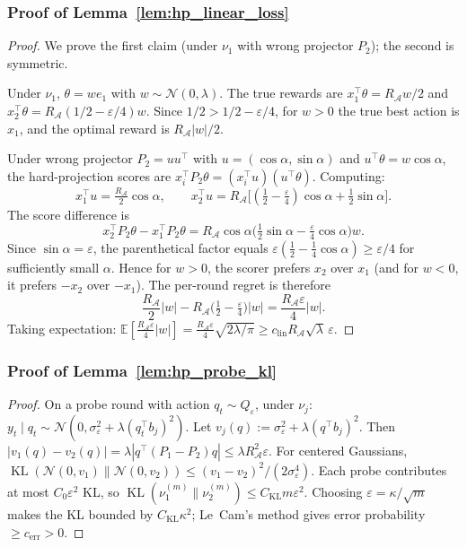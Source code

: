 \documentclass{article}
\newcommand{\E}{\mathbb{E}}
\newcommand{\cA}{\mathcal{A}}
\DeclareMathOperator{\KL}{KL}
\begin{document}
\subsubsection{Proof of Lemma~\ref{lem:hp_linear_loss}}
\label{proof:hp_linear_loss}

\begin{proof}
We prove the first claim (under $\nu_1$ with wrong projector $P_2$); the second is symmetric.

Under $\nu_1$, $\theta = w e_1$ with $w \sim \mathcal{N}(0, \lambda)$.  The true rewards are
$x_1^\top\theta = R_{\cA} w/2$ and $x_2^\top\theta = R_{\cA}(1/2 - \varepsilon/4)w$.
Since $1/2 > 1/2 - \varepsilon/4$, for $w > 0$ the true best action is $x_1$, and the optimal reward is $R_{\cA}|w|/2$.

Under wrong projector $P_2 = uu^\top$ with $u = (\cos\alpha, \sin\alpha)$ and $u^\top\theta = w\cos\alpha$, the hard-projection scores are
$x_i^\top P_2\theta = (x_i^\top u)(u^\top\theta)$.
Computing:
\[
x_1^\top u = \tfrac{R_{\cA}}{2}\cos\alpha, \qquad
x_2^\top u = R_{\cA}\bigl[(\tfrac{1}{2} - \tfrac{\varepsilon}{4})\cos\alpha + \tfrac{1}{2}\sin\alpha\bigr].
\]
The score difference is
\[
x_2^\top P_2\theta - x_1^\top P_2\theta
= R_{\cA}\cos\alpha\bigl(\tfrac{1}{2}\sin\alpha - \tfrac{\varepsilon}{4}\cos\alpha\bigr)w.
\]
Since $\sin\alpha = \varepsilon$, the parenthetical factor equals $\varepsilon(\frac{1}{2} - \frac{1}{4}\cos\alpha) \ge \varepsilon/4$ for sufficiently small $\alpha$.
Hence for $w > 0$, the scorer prefers $x_2$ over $x_1$ (and for $w < 0$, it prefers $-x_2$ over $-x_1$).
The per-round regret is therefore
\[
\frac{R_{\cA}}{2}|w| - R_{\cA}\bigl(\tfrac{1}{2} - \tfrac{\varepsilon}{4}\bigr)|w|
= \frac{R_{\cA}\varepsilon}{4}|w|.
\]
Taking expectation: $\E[\frac{R_{\cA}\varepsilon}{4}|w|] = \frac{R_{\cA}\varepsilon}{4}\sqrt{2\lambda/\pi} \ge c_{\mathrm{lin}} R_{\cA}\sqrt{\lambda}\,\varepsilon$.
\end{proof}

\subsubsection{Proof of Lemma~\ref{lem:hp_probe_kl}}
\label{proof:hp_probe_kl}

\begin{proof}
On a probe round with action $q_t \sim Q_\varepsilon$, under $\nu_j$: $y_t \mid q_t \sim \mathcal{N}(0, \sigma_\varepsilon^2 + \lambda(q_t^\top b_j)^2)$.
Let $v_j(q) := \sigma_\varepsilon^2 + \lambda(q^\top b_j)^2$.  Then
$|v_1(q) - v_2(q)| = \lambda|q^\top(P_1 - P_2)q| \le \lambda R_{\cA}^2\varepsilon$.
For centered Gaussians,
$\KL(\mathcal{N}(0, v_1) \| \mathcal{N}(0, v_2)) \le (v_1 - v_2)^2/(2\sigma_\varepsilon^4)$.
Each probe contributes at most $C_0\varepsilon^2$ KL, so $\KL(\nu_1^{(m)} \| \nu_2^{(m)}) \le C_{\mathrm{KL}} m\varepsilon^2$.
Choosing $\varepsilon = \kappa/\sqrt{m}$ makes the KL bounded by $C_{\mathrm{KL}}\kappa^2$; Le~Cam's method gives error probability $\ge c_{\mathrm{err}} > 0$.
\end{proof}
\end{document}
